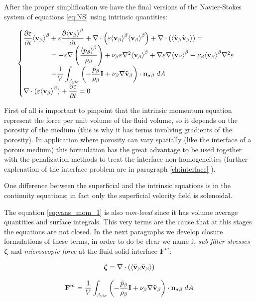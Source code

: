 After the proper simplification we have the final versions of the Navier-Stokes system of equations \eqref{eq:NS} using intrinsic quantities:

\begin{eqnarray}
\begin{cases}
 \dfrac{\partial \varepsilon}{\partial t}{\left< \textbf{v}_{\beta} \right>}^{\beta} + \varepsilon \dfrac{\partial {\left< \textbf{v}_{\beta}\right>}^{\beta}}{\partial t} + \nabla \cdot \left(\varepsilon {\left< \textbf{v}_{\beta}\right>}^{\beta}{\left< \textbf{v}_{\beta} \right>}^{\beta}\right)   + \nabla \cdot \left({\left< \tilde{\textbf{v}}_{\beta} \tilde{\textbf{v}}_{\beta} \right>}\right) =  \\
\qquad \qquad = -\varepsilon \nabla \left(\dfrac{{\left< p_{\beta} \right>}^{\beta}}{\rho_{\beta}}\right) + \nu_{\beta} \varepsilon \nabla^2 {\left< \textbf{v}_{\beta} \right>}^{\beta} +  \nabla \varepsilon \nabla {\left< \textbf{v}_{\beta}\right>}^{\beta} + \nu_{\beta} {\left< \textbf{v}_{\beta} \right>}^{\beta} \nabla^2 \varepsilon  \\
\qquad \qquad + \dfrac{1}{V} \displaystyle\int_{A_{\beta \sigma}} \left(-\dfrac{\tilde{p}_{\beta}}{\rho_{\beta}} \mathbf{I}  + \nu_{\beta} \nabla \tilde{\textbf{v}}_{\beta} \right)\cdot \mathbf{n}_{\sigma \beta} \;dA \\
 \nabla \cdot (\varepsilon{\left< \textbf{v}_{\beta}\right>}^{\beta} ) + \dfrac{\partial \varepsilon}{\partial t}= 0 
\end{cases}
\label{eq:vans_mom_1}
\end{eqnarray}


First of all is important to pinpoint that the intrinsic momentum equation represent the force per unit volume of the fluid volume, so it depends on the porosity of the medium (this is why it has terms involving gradients of the porosity).
In application where porosity can vary spatially (like the interface of a porous medium) this formulation has the great advantage to be used together with the penalization methods to treat the interface non-homogeneities (further explenation of the interface problem are in paragraph \ref{ch:interface}  ).

One difference between the superficial and the intrinsic equations is in the continuity equations; in fact only the superficial velocity field is solenoidal.

The equation \eqref{eq:vans_mom_1} is also \textit{non-local} since it has volume average quantities and surface integrals.
This very terms are the cause that at this stages the equations are not closed.
In the next paragraphs we develop closure formulations of these terms, in order to do be clear we name it \textit{sub-filter stresses} $\boldsymbol{\zeta}$ and \textit{microscopic force} at the fluid-solid interface $\mathbf{F}^m$:

$$
\boldsymbol{\zeta} = \nabla \cdot \left({\left< \tilde{\textbf{v}}_{\beta} \tilde{\textbf{v}}_{\beta} \right>}\right)
$$

$$
\mathbf{F}^m =  \dfrac{1}{V} \int_{A_{\beta \sigma}} \left(-\dfrac{\tilde{p}_{\beta}}{\rho_{\beta}} \mathbf{I}  + \nu_{\beta} \nabla \tilde{\textbf{v}}_{\beta} \right)\cdot \mathbf{n}_{\sigma \beta} \;dA
$$



